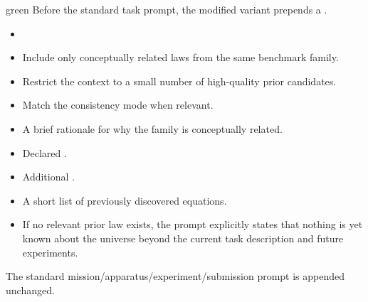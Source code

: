 \begin{promptbox}{green}
\small
{} Before the standard task prompt, the modified variant prepends a .

\medskip
{}
\begin{itemize}
    \item {}
\end{itemize}

\begin{itemize}
    \item Include only conceptually related laws from the same benchmark family.
    \item Restrict the context to a small number of high-quality prior candidates.
    \item Match the consistency mode when relevant.
\end{itemize}

\begin{itemize}
    \item A brief rationale for why the family is conceptually related.
    \item Declared .
    \item Additional .
    \item A short list of previously discovered equations.
\end{itemize}

\begin{itemize}
    \item If no relevant prior law exists, the prompt explicitly states that nothing is yet known about the universe beyond the current task description and future experiments.
\end{itemize}

 The standard mission/apparatus/experiment/submission prompt is appended unchanged.
\end{promptbox}

